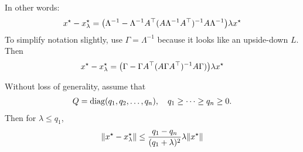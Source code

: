 \documentclass[12pt]{article}
\begin{document}
In other words:
\begin{align*}
  x^\star - x_\lambda ^\star
    = {\left(\Lambda^{-1} -
      \Lambda^{-1} A^\top (A \Lambda^{-1} A^\top)^{-1} A \Lambda^{-1}\right)}
      \lambda x^\star
\end{align*}
To simplify notation slightly, use \(\Gamma = \Lambda^{-1}\)
because it looks like an upside-down \(L\).
Then
\begin{align*}
  x^\star - x_\lambda ^\star
    = {\left(\Gamma - \Gamma A^\top (A \Gamma A^\top)^{-1} A \Gamma)\right)}
      \lambda x^\star
\end{align*}

\begin{theorem}
  Without loss of generality, assume that
  \begin{align*}
    Q = \operatorname{diag}(q_1, q_2, \ldots, q_n),
      \quad q_1 \geq \cdots \geq q_n \geq 0.
  \end{align*}
  Then for \(\lambda \leq q_1\),
  \begin{align*}
    {\left\lVert x^\star - x_\lambda ^\star\right\rVert}
      \leq \frac{q_1 - q_n}{(q_1 + \lambda)^2} \lambda {\left\lVert x^\star\right\rVert}
  \end{align*}
\end{theorem}
\end{document}
